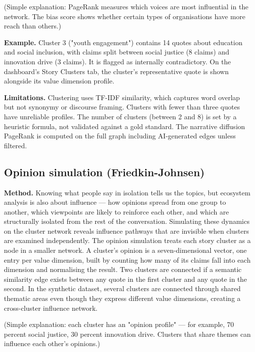\documentclass[11pt,a4paper]{article}
\begin{document}
(Simple explanation: PageRank measures which voices are most influential
in the network. The bias score shows whether certain types of
organisations have more reach than others.)

\textbf{Example.} Cluster 3 ("youth engagement") contains 14 quotes about
education and social inclusion, with claims split between social justice
(8 claims) and innovation drive (3 claims). It is flagged as internally
contradictory. On the dashboard's Story Clusters tab, the cluster's
representative quote is shown alongside its value dimension profile.

\textbf{Limitations.} Clustering uses TF-IDF similarity, which captures word
overlap but not synonymy or discourse framing. Clusters with fewer than
three quotes have unreliable profiles. The number of clusters (between 2
and 8) is set by a heuristic formula, not validated against a gold
standard. The narrative diffusion PageRank is computed on the full graph
including AI-generated edges unless filtered.

\subsection{Opinion simulation (Friedkin-Johnsen)}

\textbf{Method.} Knowing what people say in isolation tells us the topics, but
ecosystem analysis is also about influence — how opinions spread from
one group to another, which viewpoints are likely to reinforce each
other, and which are structurally isolated from the rest of the
conversation. Simulating these dynamics on the cluster network reveals
influence pathways that are invisible when clusters are examined
independently. The opinion simulation treats each story cluster as a
node in a smaller network. A cluster's opinion is a seven-dimensional
vector, one entry per value dimension, built by counting how many of its
claims fall into each dimension and normalising the result. Two clusters
are connected if a semantic similarity edge exists between any quote in
the first cluster and any quote in the second. In the synthetic dataset,
several clusters are connected through shared thematic areas even though
they express different value dimensions, creating a cross-cluster
influence network.

(Simple explanation: each cluster has an "opinion profile" — for example,
70 percent social justice, 30 percent innovation drive. Clusters that
share themes can influence each other's opinions.)
\end{document}
